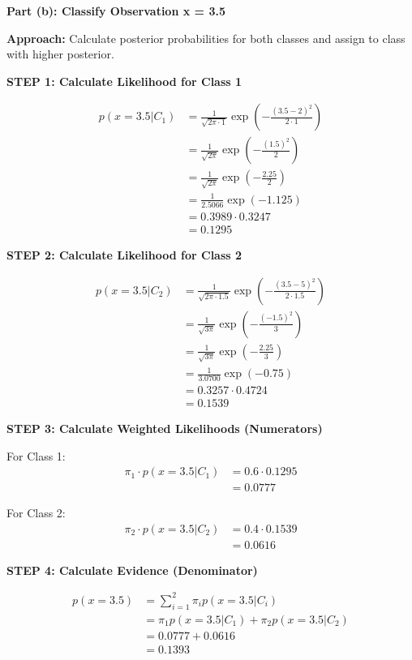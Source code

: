 \documentclass[12pt]{article}
\begin{document}
\begin{solution}

\textbf{Part (b): Classify Observation x = 3.5}

\textbf{Approach:} Calculate posterior probabilities for both classes and assign to class with higher posterior.

\textbf{STEP 1: Calculate Likelihood for Class 1}

\begin{align*}
p(x = 3.5|C_1) &= \frac{1}{\sqrt{2\pi \cdot 1}} \exp\left(-\frac{(3.5-2)^2}{2 \cdot 1}\right) \\
&= \frac{1}{\sqrt{2\pi}} \exp\left(-\frac{(1.5)^2}{2}\right) \\
&= \frac{1}{\sqrt{2\pi}} \exp\left(-\frac{2.25}{2}\right) \\
&= \frac{1}{2.5066} \exp(-1.125) \\
&= 0.3989 \cdot 0.3247 \\
&= 0.1295
\end{align*}

\textbf{STEP 2: Calculate Likelihood for Class 2}

\begin{align*}
p(x = 3.5|C_2) &= \frac{1}{\sqrt{2\pi \cdot 1.5}} \exp\left(-\frac{(3.5-5)^2}{2 \cdot 1.5}\right) \\
&= \frac{1}{\sqrt{3\pi}} \exp\left(-\frac{(-1.5)^2}{3}\right) \\
&= \frac{1}{\sqrt{3\pi}} \exp\left(-\frac{2.25}{3}\right) \\
&= \frac{1}{3.0700} \exp(-0.75) \\
&= 0.3257 \cdot 0.4724 \\
&= 0.1539
\end{align*}

\textbf{STEP 3: Calculate Weighted Likelihoods (Numerators)}

For Class 1:
\begin{align*}
\pi_1 \cdot p(x = 3.5|C_1) &= 0.6 \cdot 0.1295 \\
&= 0.0777
\end{align*}

For Class 2:
\begin{align*}
\pi_2 \cdot p(x = 3.5|C_2) &= 0.4 \cdot 0.1539 \\
&= 0.0616
\end{align*}

\textbf{STEP 4: Calculate Evidence (Denominator)}

\begin{align*}
p(x = 3.5) &= \sum_{i=1}^{2} \pi_i p(x = 3.5|C_i) \\
&= \pi_1 p(x = 3.5|C_1) + \pi_2 p(x = 3.5|C_2) \\
&= 0.0777 + 0.0616 \\
&= 0.1393
\end{align*}


\end{solution}
\end{document}
